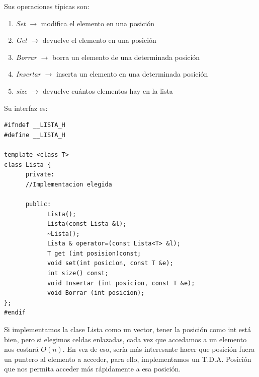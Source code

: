 \documentclass[10pt,a4paper,spanish]{report}
\begin{document}
\noindent
Sus operaciones típicas son:
\begin{enumerate}[---]
\item \textit{\textcolor[rgb]{0.2,0.5,0.5}{Set}} $\longrightarrow$ modifica el elemento en una posición
\item \textit{\textcolor[rgb]{0.2,0.5,0.5}{Get}} $\longrightarrow$ devuelve el elemento en una posición
\item \textit{\textcolor[rgb]{0.2,0.5,0.5}{Borrar}} $\longrightarrow$ borra un elemento de una determinada posición
\item \textit{\textcolor[rgb]{0.2,0.5,0.5}{Insertar}} $\longrightarrow$ inserta un elemento en una determinada posición
\item \textit{\textcolor[rgb]{0.2,0.5,0.5}{size}} $\longrightarrow$ devuelve cuántos elementos hay en la lista
\end{enumerate}

\noindent
Su interfaz es:
\begin{verbatim}
#ifndef __LISTA_H
#define __LISTA_H

template <class T>
class Lista {
      private:
      //Implementacion elegida

      public:
            Lista();
            Lista(const Lista &l);
            ~Lista();
            Lista & operator=(const Lista<T> &l);
            T get (int posision)const;
            void set(int posicion, const T &e);
            int size() const;
            void Insertar (int posicion, const T &e);
            void Borrar (int posicion);
};
#endif
\end{verbatim}

\noindent
Si implementamos la clase Lista como un vector, tener la posición como int está bien, pero si elegimos celdas enlazadas, cada vez que accedamos a un elemento nos costará $O(n)$. En vez de eso, sería más interesante hacer que posición fuera un puntero al elemento a acceder, para ello, implementamos un T.D.A. Posición que nos permita acceder más rápidamente a esa posición.
\end{document}
